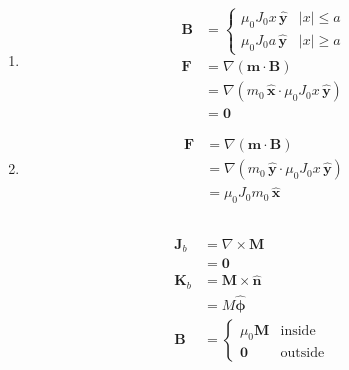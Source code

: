 \documentclass{article}
\renewcommand{\vec}[1]{\boldsymbol{\mathbf{#1}}}
\newcommand{\uvec}[1]{\hat{\vec{#1}}}
\begin{document}
\setcounter{subsection}{4}
\subsection{}

\begin{enumerate}
  \item

        \begin{align*}
          \vec{B} & = \begin{cases}
                        \mu_0 J_0 x \,\uvec{y} & |x| \le a \\
                        \mu_0 J_0 a \,\uvec{y} & |x| \ge a
                      \end{cases}                   \\
          \vec{F} & = \nabla (\vec{m} \cdot \vec{B})                       \\
                  & = \nabla (m_0 \,\uvec{x} \cdot \mu_0 J_0 x \,\uvec{y}) \\
                  & = \vec{0}
        \end{align*}

  \item

        \begin{align*}
          \vec{F} & = \nabla (\vec{m} \cdot \vec{B})                       \\
                  & = \nabla (m_0 \,\uvec{y} \cdot \mu_0 J_0 x \,\uvec{y}) \\
                  & = \mu_0 J_0 m_0 \,\uvec{x}
        \end{align*}
\end{enumerate}

\setcounter{subsection}{6}
\subsection{}

\begin{align*}
  \vec{J}_b & = \nabla \times \vec{M}          \\
            & = \vec{0}                        \\
  \vec{K}_b & = \vec{M} \times \uvec{n}        \\
            & = M \uvec{\phi}                  \\
  \vec{B}   & = \begin{cases}
                  \mu_0 \vec{M} & \text{inside}  \\
                  \vec{0}       & \text{outside}
                \end{cases}
\end{align*}
\end{document}
